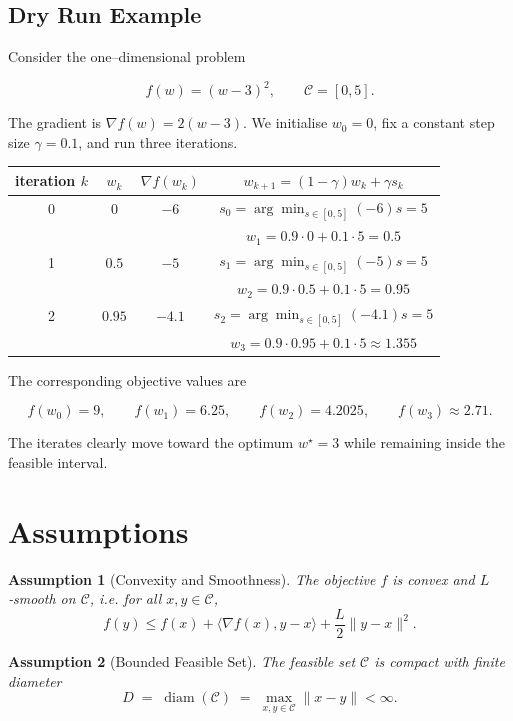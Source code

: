 \documentclass{article}
\newtheorem{assumption}{Assumption}
\newcommand{\diam}{\operatorname{diam}}
\begin{document}
\subsection*{Dry Run Example}
Consider the one–dimensional problem  

\[
f(w) = (w-3)^2 ,\qquad \mathcal{C}=[0,5] .
\]

The gradient is $\nabla f(w)=2(w-3)$.  
We initialise $w_0=0$, fix a constant step size $\gamma=0.1$, and run three iterations.

\begin{center}
\begin{tabular}{c|c|c|c}
iteration $k$ & $w_k$ & $\nabla f(w_k)$ & $w_{k+1}=(1-\gamma)w_k+\gamma s_k$ \\ \hline
0 & $0$ & $-6$ & $s_0=\arg\min_{s\in[0,5]}(-6)s = 5$\\
  &   &      & $w_1 = 0.9\cdot0+0.1\cdot5 = 0.5$ \\ \hline
1 & $0.5$ & $-5$ & $s_1=\arg\min_{s\in[0,5]}(-5)s = 5$\\
  &   &      & $w_2 = 0.9\cdot0.5+0.1\cdot5 = 0.95$ \\ \hline
2 & $0.95$ & $-4.1$ & $s_2=\arg\min_{s\in[0,5]}(-4.1)s = 5$\\
  &   &      & $w_3 = 0.9\cdot0.95+0.1\cdot5 \approx 1.355$ \\ \hline
\end{tabular}
\end{center}

The corresponding objective values are  

\[
f(w_0)=9,\qquad f(w_1)=6.25,\qquad f(w_2)=4.2025,\qquad f(w_3)\approx 2.71 .
\]

The iterates clearly move toward the optimum $w^\star=3$ while remaining inside the feasible interval.

\section*{Assumptions}
\begin{assumption}[Convexity and Smoothness]\label{ass:convex-smooth}
The objective $f$ is convex and $L$‑smooth on $\mathcal{C}$, i.e. for all $x,y\in\mathcal{C}$,
\[
f(y)\le f(x)+\langle\nabla f(x),y-x\rangle+\frac{L}{2}\|y-x\|^2 .
\tag{3}
\]
\end{assumption}

\begin{assumption}[Bounded Feasible Set]\label{ass:bounded}
The feasible set $\mathcal{C}$ is compact with finite diameter
\[
D \;=\; \diam(\mathcal{C}) \;=\; \max_{x,y\in\mathcal{C}}\|x-y\| <\infty .
\tag{4}
\]
\end{assumption}
\end{document}
